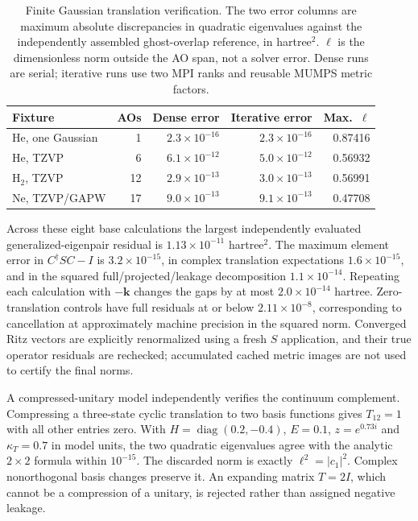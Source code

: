 \documentclass[11pt]{article}
\begin{document}
\begin{table}[htbp]
\centering\small
\caption{Finite Gaussian translation verification. The two error
columns are maximum absolute discrepancies in quadratic eigenvalues
against the independently assembled ghost-overlap reference, in
hartree$^2$. $\ell$ is the dimensionless norm outside the AO span,
not a solver error. Dense runs are serial; iterative runs use two
MPI ranks and reusable MUMPS metric factors.}
\label{tab:gaussian-translation}
\begin{tabular}{lrrrr}
\toprule
Fixture & AOs & Dense error & Iterative error & Max.\ $\ell$\\
\midrule
He, one Gaussian & 1 & $2.3\times10^{-16}$ & $2.3\times10^{-16}$ & 0.87416\\
He, TZVP & 6 & $6.1\times10^{-12}$ & $5.0\times10^{-12}$ & 0.56932\\
H$_2$, TZVP & 12 & $2.9\times10^{-13}$ & $3.0\times10^{-13}$ & 0.56991\\
Ne, TZVP/GAPW & 17 & $9.0\times10^{-13}$ & $9.1\times10^{-13}$ & 0.47708\\
\bottomrule
\end{tabular}
\end{table}

Across these eight base calculations the largest independently
evaluated generalized-eigenpair residual is
$1.13\times10^{-11}$ hartree$^2$.
The maximum element error in $C^\dagger SC-I$ is
$3.2\times10^{-15}$, in complex translation expectations
$1.6\times10^{-15}$, and in the squared full/projected/leakage
decomposition $1.1\times10^{-14}$. Repeating each calculation
with $-\bm k$ changes the gaps by at most
$2.0\times10^{-14}$ hartree. Zero-translation controls have
full residuals at or below $2.11\times10^{-8}$, corresponding
to cancellation at approximately machine precision in the
squared norm. Converged Ritz vectors are explicitly renormalized
using a fresh $S$ application, and their true operator residuals
are rechecked; accumulated cached metric images are not used
to certify the final norms.

A compressed-unitary model independently verifies the continuum
complement. Compressing a three-state cyclic translation to two
basis functions gives $T_{12}=1$ with all other entries zero.
With $H=\operatorname{diag}(0.2,-0.4)$, $E=0.1$,
$z=e^{0.73i}$ and $\kappa_T=0.7$ in model units, the two
quadratic eigenvalues agree with the analytic $2\times2$
formula within $10^{-15}$. The discarded norm is exactly
$\ell^2=|c_1|^2$. Complex nonorthogonal basis changes preserve
it. An expanding matrix $T=2I$, which cannot be a compression
of a unitary, is rejected rather than assigned negative leakage.
\end{document}
